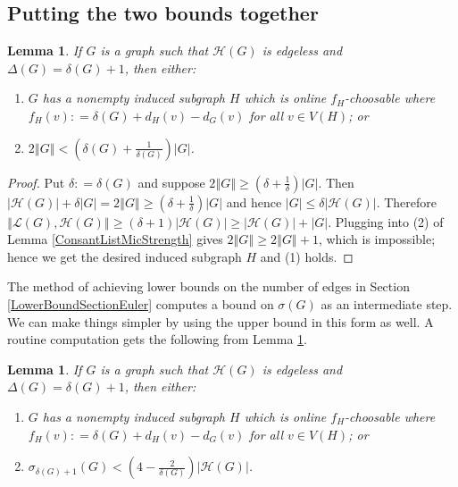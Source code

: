 \documentclass[12pt]{article}
\theoremstyle{plain}
\newtheorem{lem}[thm]{Lemma}
\theoremstyle{definition}
\theoremstyle{remark}
\newcommand{\fancy}[1]{\mathcal{#1}}
\renewcommand{\L}{\fancy{L}}
\newcommand{\HH}{\fancy{H}}
\newcommand{\card}[1]{\left|#1\right|}
\newcommand{\size}[1]{\left\Vert#1\right\Vert}
\newcommand{\parens}[1]{\left( #1 \right)}
\newcommand{\DefinedAs}{\mathrel{\mathop:}=}
\begin{document}
\subsection{Putting the two bounds together}
\begin{lem}\label{OrePrecursor1}
If $G$ is a graph such that $\HH(G)$ is edgeless and $\Delta(G) = \delta(G) + 1$, then either:
\begin{enumerate}
\item $G$ has a nonempty induced subgraph $H$ which is online $f_H$-choosable where $f_H(v) \DefinedAs \delta(G) + d_H(v) - d_G(v)$ for all $v \in V(H)$; or
\item $2\size{G} < \parens{\delta(G) + \frac{1}{\delta(G)}}\card{G}$.
\end{enumerate}
\end{lem}
\begin{proof}
Put $\delta \DefinedAs \delta(G)$ and suppose $2\size{G} \geq \parens{\delta + \frac{1}{\delta}}\card{G}$.  Then $\card{\HH(G)} + \delta\card{G} = 2\size{G} \geq \parens{\delta + \frac{1}{\delta}}\card{G}$ and hence $\card{G} \leq \delta\card{\HH(G)}$.  Therefore $\size{\L(G), \HH(G)} \geq (\delta + 1)\card{\HH(G)} \geq \card{\HH(G)} + \card{G}$.  Plugging into (2) of Lemma \ref{ConsantListMicStrength} gives $2\size{G} \geq 2\size{G} + 1$, which is impossible; hence we get the desired induced subgraph $H$ and (1) holds.
\end{proof}

The method of achieving lower bounds on the number of edges in Section \ref{LowerBoundSectionEuler} computes a bound on $\sigma(G)$ as an intermediate step. We can make things simpler by using the upper bound in this form as well.  A routine computation gets the following from Lemma \ref{OrePrecursor1}.

\begin{lem}\label{OrePrecursor2}
If $G$ is a graph such that $\HH(G)$ is edgeless and $\Delta(G) = \delta(G) + 1$, then either:
\begin{enumerate}
\item $G$ has a nonempty induced subgraph $H$ which is online $f_H$-choosable where $f_H(v) \DefinedAs \delta(G) + d_H(v) - d_G(v)$ for all $v \in V(H)$; or
\item $\sigma_{\delta(G) + 1}(G) < \parens{4 - \frac{2}{\delta(G)}}\card{\HH(G)}$.
\end{enumerate}
\end{lem}
\end{document}
